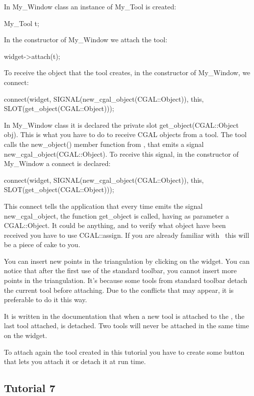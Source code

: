 In My\_Window class an instance of My\_Tool is created:
\begin{ccExampleCode}
My_Tool	t;
\end{ccExampleCode}
In the constructor of My\_Window we attach the tool:
\begin{ccExampleCode}
widget->attach(t);
\end{ccExampleCode}

To receive the object that the tool creates, in the constructor of My\_Window, 
we connect:
\begin{ccExampleCode}
connect(widget, SIGNAL(new_cgal_object(CGAL::Object)), 
            this, SLOT(get_object(CGAL::Object)));
\end{ccExampleCode}
In My\_Window class it is declared the private slot get\_object(CGAL::Object obj). 
This is what you have to do to receive CGAL objects from a tool. The
tool calls the new\_object() member function from , that emits
a signal new\_cgal\_object(CGAL::Object). To receive this signal, in the
constructor of My\_Window a connect is declared:
\begin{ccExampleCode}
connect(widget, SIGNAL(new\_cgal\_object(CGAL::Object)), 
             this, SLOT(get\_object(CGAL::Object)));
\end{ccExampleCode}

This connect tells the application that every time  emits the
signal new\_cgal\_object, the function get\_object is called, having as
parameter a CGAL::Object. It could be anything, and to verify what
object have been received you have to use CGAL::assign. If you are
already familiar with \cgal\ this will be a piece of cake to you.

You can insert new points in the triangulation by clicking on the
widget. You can notice that after the first use of the standard
toolbar, you cannot insert more points in the triangulation. It's
because some tools from standard toolbar detach the current tool
before attaching. Due to the conflicts that may appear, it is
preferable to do it this way.

It is written in the documentation that when a new tool is attached to the
, the last tool attached, is detached. Two tools will
never be attached in the same time on the widget.

To attach again the tool created in this tutorial you have to create
some button that lets you attach it or detach it at run time.

\subsection*{Tutorial 7}

